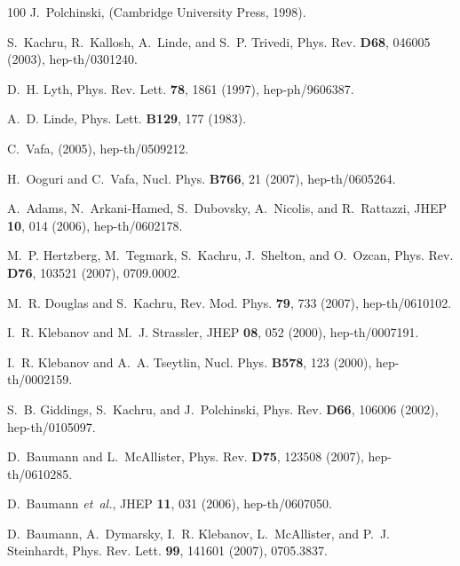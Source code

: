 \documentclass[12pt,letterpaper,rotate]{article}
\begin{document}
{\begin{thebibliography}{100}
J.~Polchinski,
 (Cambridge
  University Press, 1998).

S.~Kachru, R.~Kallosh, A.~Linde, and S.~P. Trivedi,
\newblock Phys. Rev. {\bf D68}, 046005 (2003), hep-th/0301240.

D.~H. Lyth,
\newblock Phys. Rev. Lett. {\bf 78}, 1861 (1997), hep-ph/9606387.

A.~D. Linde,
\newblock Phys. Lett. {\bf B129}, 177 (1983).

C.~Vafa,
\newblock (2005), hep-th/0509212.

H.~Ooguri and C.~Vafa,
\newblock Nucl. Phys. {\bf B766}, 21 (2007), hep-th/0605264.

A.~Adams, N.~Arkani-Hamed, S.~Dubovsky, A.~Nicolis, and R.~Rattazzi,
\newblock JHEP {\bf 10}, 014 (2006), hep-th/0602178.

M.~P. Hertzberg, M.~Tegmark, S.~Kachru, J.~Shelton, and O.~Ozcan,
\newblock Phys. Rev. {\bf D76}, 103521 (2007), 0709.0002.

M.~R. Douglas and S.~Kachru,
\newblock Rev. Mod. Phys. {\bf 79}, 733 (2007), hep-th/0610102.

I.~R. Klebanov and M.~J. Strassler,
\newblock JHEP {\bf 08}, 052 (2000), hep-th/0007191.

I.~R. Klebanov and A.~A. Tseytlin,
\newblock Nucl. Phys. {\bf B578}, 123 (2000), hep-th/0002159.

S.~B. Giddings, S.~Kachru, and J.~Polchinski,
\newblock Phys. Rev. {\bf D66}, 106006 (2002), hep-th/0105097.

D.~Baumann and L.~McAllister,
\newblock Phys. Rev. {\bf D75}, 123508 (2007), hep-th/0610285.

D.~Baumann {\em et~al.},
\newblock JHEP {\bf 11}, 031 (2006), hep-th/0607050.

D.~Baumann, A.~Dymarsky, I.~R. Klebanov, L.~McAllister, and P.~J. Steinhardt,
\newblock Phys. Rev. Lett. {\bf 99}, 141601 (2007), 0705.3837.


\end{thebibliography}}
\end{document}
